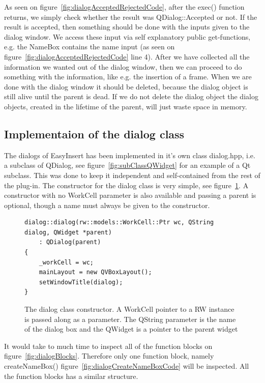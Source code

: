 As seen on figure~\ref{fig:dialogAcceptedRejectedCode}, after the exec() function returns, we simply check whether the result was QDialog::Accepted or not. If the result is accepted, then something should be done with the inputs given to the dialog window. We access these input via self explanatory public get-functions, e.g. the NameBox contains the name input (as seen on figure~\ref{fig:dialogAcceptedRejectedCode} line 4). After we have collected all the information we wanted out of the dialog window, then we can proceed to do something with the information, like e.g. the insertion of a frame. When we are done with the dialog window it should be deleted, because the dialog object is still alive until the parent is dead. If we do not delete the dialog object the dialog objects, created in the lifetime of the parent, will just waste space in memory. 

\subsection{Implementaion of the dialog class}
The dialogs of EasyInsert has been implemented in it's own class dialog.hpp, i.e. a subclass of QDialog, see figure~\ref{fig:subClassQWidget} for an example of a Qt subclass. This was done to keep it independent and self-contained from the rest of the plug-in. The constructor for the dialog class is very simple, see figure~\ref{fig:dialogConstructor}. A constructor with no WorkCell parameter is also available and passing a parent is optional, though a name must always be given to the constructor. 

\begin{figure}[h] %
\centering
\lstset{language=C++} 
\begin{lstlisting}[frame=single]  
dialog::dialog(rw::models::WorkCell::Ptr wc, QString dialog, QWidget *parent)
    : QDialog(parent)
{
    _workCell = wc;
    mainLayout = new QVBoxLayout();
    setWindowTitle(dialog);
}			 
\end{lstlisting}
\caption{The dialog class constructor. A WorkCell pointer to a RW instance is passed along as a parameter. The QString parameter is the name of the dialog box and the QWidget is a pointer to the parent widget }
\label{fig:dialogConstructor} 	
\end{figure}

It would take to much time to inspect all of the function blocks on figure~\ref{fig:dialogBlocks}. Therefore only one function block, namely createNameBox() figure~\ref{fig:dialogCreateNameBoxCode} will be inspected. All the function blocks has a similar structure.


